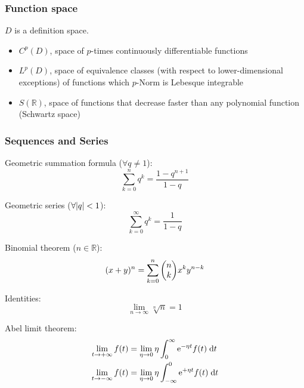 		\subsubsection{Function space}
			\noindent
			$D$ is a definition space.
			\begin{itemize}
				\item $C^p(D)$, space of $p$-times continuously differentiable functions
				\item $L^p(D)$, space of equivalence classes (with respect to lower-dimensional exceptions) of functions which $p$-Norm is Lebesque integrable
				\item $S(\mathbb{R})$, space of functions that decrease faster than any polynomial function (Schwartz space)
			\end{itemize}

		\subsubsection{Sequences and Series}
			\noindent
			Geometric summation formula ($\forall q \ne 1$):
			\begin{equation}
				\sum_{k=0}^n q^k=\frac{1-q^{n+1}}{1-q}
			\end{equation}

			\noindent
			Geometric series ($\forall \abs{q} < 1$):
			\begin{equation}
				\sum_{k=0}^\infty q^k= \frac{1}{1-q}
			\end{equation}

			\noindent
			Binomial theorem ($n\in\mathbb{R}$):
			\begin{equation}
				(x+y)^n=\sum_{k=0}^{n}\binomkoeff{n}{k}x^k y^{n-k}
			\end{equation}

			\noindent
			Identities:
			\begin{equation}
				\lim_{n\rightarrow\infty} \sqrt[n]{n} = 1
			\end{equation}

			\noindent
			Abel limit theorem:
			\begin{equation}
				\begin{aligned}
					\lim_{t\rightarrow+\infty} f(t) &= \lim_{\eta\rightarrow 0} \eta \int_0^\infty \mathrm{e}^{-\eta t} f(t) \;\dd t \\
					\lim_{t\rightarrow-\infty} f(t) &= \lim_{\eta\rightarrow 0} \eta \int_{-\infty}^{0} \mathrm{e}^{+\eta t} f(t) \;\dd t \\
				\end{aligned}
			\end{equation}

